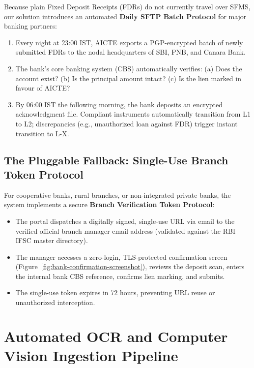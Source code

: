\documentclass[12pt, a4paper]{report}
\begin{document}
Because plain Fixed Deposit Receipts (FDRs) do not currently travel over SFMS, our solution introduces an automated \textbf{Daily SFTP Batch Protocol} for major banking partners:
\begin{enumerate}[leftmargin=2em]
  \item Every night at 23:00 IST, AICTE exports a PGP-encrypted batch of newly submitted FDRs to the nodal headquarters of SBI, PNB, and Canara Bank.
  \item The bank's core banking system (CBS) automatically verifies: (a) Does the account exist? (b) Is the principal amount intact? (c) Is the lien marked in favour of AICTE?
  \item By 06:00 IST the following morning, the bank deposits an encrypted acknowledgment file. Compliant instruments automatically transition from L1 to L2; discrepancies (e.g., unauthorized loan against FDR) trigger instant transition to L-X.
\end{enumerate}

\section{The Pluggable Fallback: Single-Use Branch Token Protocol}

For cooperative banks, rural branches, or non-integrated private banks, the system implements a secure \textbf{Branch Verification Token Protocol}:
\begin{itemize}[leftmargin=2em]
  \item The portal dispatches a digitally signed, single-use URL via email to the verified official branch manager email address (validated against the RBI IFSC master directory).
  \item The manager accesses a zero-login, TLS-protected confirmation screen (Figure~\ref{fig:bank-confirmation-screenshot}), reviews the deposit scan, enters the internal bank CBS reference, confirms lien marking, and submits.
  \item The single-use token expires in 72 hours, preventing URL reuse or unauthorized interception.
\end{itemize}


\chapter{Automated OCR and Computer Vision Ingestion Pipeline}
\end{document}
